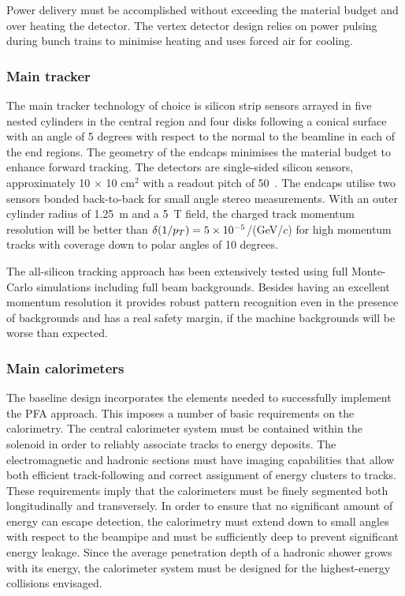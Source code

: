 Power delivery must be accomplished without exceeding the material budget and
over heating the detector.  The vertex detector 
design relies on power pulsing during bunch trains to minimise heating 
and uses forced air for cooling. 

\subsubsection{Main tracker}
The main tracker technology of
choice is silicon strip sensors arrayed in five nested cylinders in the central
region and four disks following a conical surface with an angle of 5 degrees
with respect to the normal to the beamline in each of the end regions. The geometry of the endcaps
minimises the material budget to enhance forward tracking. The detectors are
single-sided silicon sensors, approximately 10 $\times$ 10 cm$^2$ with a readout
pitch of 50~\micron. The endcaps utilise two sensors bonded back-to-back for
small angle stereo measurements. With an outer cylinder radius of 1.25~m
and a 5~T field, the charged track momentum resolution will be better than
$\delta (1/p_T) = 5 \times 10^{-5} $/(GeV/$c$) for high momentum tracks with coverage down to polar angles of 10 degrees.

The all-silicon tracking approach has been extensively tested using full Monte-Carlo
simulations including full beam backgrounds. Besides having an excellent momentum resolution
it provides robust pattern recognition even in the presence of backgrounds and has a
real safety margin, if the machine backgrounds will be worse than expected.

\subsubsection{Main calorimeters}

The \sid  baseline design incorporates the elements needed to
successfully implement the PFA approach. This imposes a number of
basic requirements on the calorimetry. The central calorimeter
system must be contained within the solenoid in order to reliably associate
tracks to energy deposits. The electromagnetic and hadronic sections
must have imaging capabilities that allow both efficient
track-following and correct assignment of energy clusters to tracks. These
requirements imply that the calorimeters must be finely segmented both
longitudinally and transversely. In order to ensure that no significant amount
of energy can escape detection, the calorimetry must extend down to small
angles with respect to the beampipe and must be sufficiently deep to prevent
significant energy leakage. Since the average penetration depth of a hadronic
shower grows with its energy, the calorimeter system must be designed for the
highest-energy collisions envisaged.

